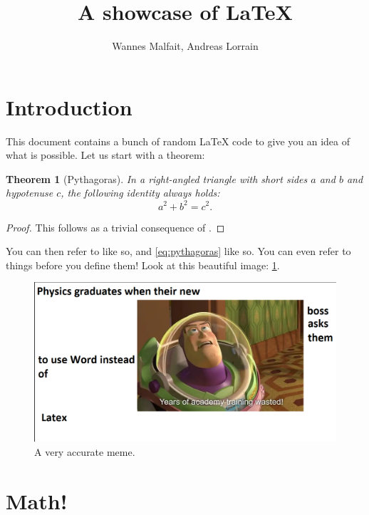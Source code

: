 \documentclass{article}
\title{A showcase of \LaTeX}
\author{Wannes Malfait, Andreas Lorrain}
\theoremstyle{plain}
\newtheorem{theorem}{Theorem}[section] %
\theoremstyle{definition}
\theoremstyle{remark}
\begin{document}
\maketitle
\newpage

\tableofcontents
\newpage

\section{Introduction}

This document contains a bunch of random \LaTeX{} code to give you an idea of what is
possible. Let us start with a theorem:
\begin{theorem}[Pythagoras] %
	\label{thm:pythagoras}
	In a right-angled triangle with short sides $a$ and $b$ and hypotenuse $c$,
	the following identity always holds:
	\begin{equation}\label{eq:pythagoras}
		a^2 + b^2 = c^2.
	\end{equation}
\end{theorem}
\begin{proof}
	This follows as a trivial consequence of \cite[Theorem 6.9]{GeissLeclercSchroer2008PFvar}.
\end{proof}

You can then refer to  like so, and \cref{eq:pythagoras} like so.
You can even refer to things before you define them! Look at this beautiful image:
\cref{fig:meme}.
\begin{figure}
	\centering

	\includegraphics[width=0.7\columnwidth, trim={2mm 2mm 2mm 2mm},clip]{meme.png}

	\caption{A very accurate meme.}
	\label{fig:meme}
\end{figure}

\section{Math!}
\end{document}
